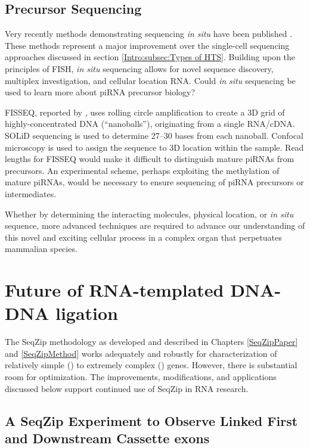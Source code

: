   \subsection{Precursor Sequencing}
    \label{Disc:subsec:Sequencing of Precursors}

    Very recently methods demonstrating sequencing \textit{in situ} have been published \citep{Ke2013,Lee2014a}. These methods represent a major improvement over the single-cell sequencing approaches discussed in section \ref{Intro:subsec:Types of HTS}. Building upon the principles of FISH, \textit{in situ} sequencing allows for novel sequence discovery, multiplex investigation, and cellular location RNA. Could \textit{in situ} sequencing be used to learn more about piRNA precursor biology?

    FISSEQ, reported by \citet{Lee2014a}, uses rolling circle amplification to create a 3D grid of highly-concentrated DNA (``nanoballs''), originating from a single RNA/cDNA. SOLiD sequencing is used to determine 27--30 bases from each nanoball. Confocal microscopy is used to assign the sequence to 3D location within the sample. Read lengths for FISSEQ would make it difficult to distinguish mature piRNAs from precursors. An experimental scheme, perhaps exploiting the methylation of mature piRNAs, would be necessary to ensure sequencing of piRNA precursors or intermediates.

    Whether by determining the interacting molecules, physical location, or \textit{in situ} sequence, more advanced techniques are required to advance our understanding of this novel and exciting cellular process in a complex organ that perpetuates mammalian species.

\section{Future of RNA-templated DNA-DNA ligation}
  \label{Disc:sec:SeqZip Improvements}

  The SeqZip methodology as developed and described in Chapters \ref{SeqZipPaper} and \ref{SeqZipMethod} works adequately and robustly for characterization of relatively simple (\cd{}) to extremely complex (\dscam{}) genes. However, there is substantial room for optimization. The improvements, modifications, and applications discussed below support continued use of SeqZip in RNA research.

  \subsection{A SeqZip Experiment to Observe Linked First and Downstream Cassette exons}
    \label{Disc:subsec: Ideal SeqZip exp. to look for Coordination}

